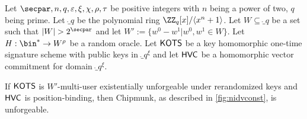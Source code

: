 \begin{lemma}\label{lem:msigunf}
  Let $\secpar,n,q,\varepsilon,\xi,\chi,\rho,\tau$ be positive integers with $n$ being a power of two, $q$ being prime.
Let $\ring_q$ be the polynomial ring $\ZZ_q[x]/\langle x^n+1\rangle$.
Let $W \subseteq \ring_q$ be a set such that $|W| > 2^\secpar$ and let $W' := \{w^0-w^1| w^0,w^1 \in W\}$.
Let $H : \bin^* \to W^\rho$ be a random oracle.
Let $\mathsf{KOTS}$ be a key homomorphic one-time signature scheme with public keys in $\ring_q^\xi$ and let $\mathsf{HVC}$ be a homomorphic vector commitment for domain $\ring_q^\xi$.

If $\mathsf{KOTS}$ is $W'$-multi-user existentially unforgeable under rerandomized keys and $\mathsf{HVC}$ is position-binding, then Chipmunk, as described in \autoref{fig:nidvconst}, is unforgeable.
\end{lemma}

